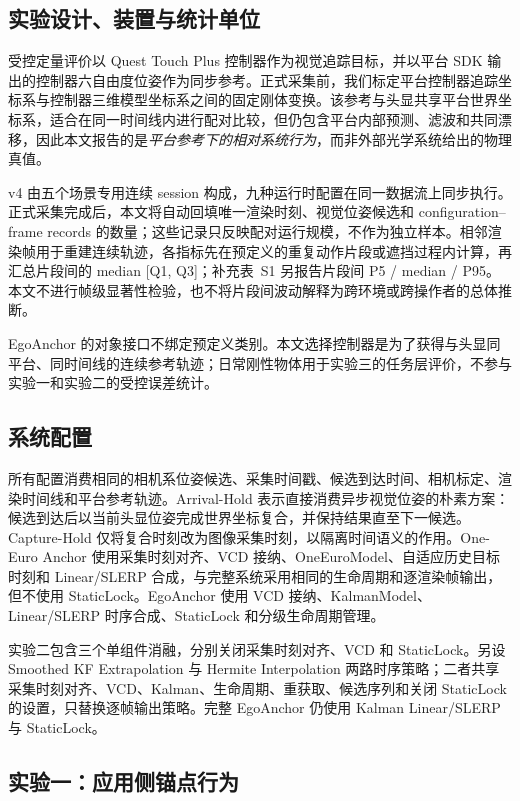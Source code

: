 \documentclass[review]{vgtc}
\begin{document}
\subsection{实验设计、装置与统计单位}

受控定量评价以 Quest Touch Plus 控制器作为视觉追踪目标，并以平台 SDK 输出的控制器六自由度位姿作为同步参考。正式采集前，我们标定平台控制器追踪坐标系与控制器三维模型坐标系之间的固定刚体变换。该参考与头显共享平台世界坐标系，适合在同一时间线内进行配对比较，但仍包含平台内部预测、滤波和共同漂移，因此本文报告的是\emph{平台参考下的相对系统行为}，而非外部光学系统给出的物理真值。

v4 由五个场景专用连续 session 构成，九种运行时配置在同一数据流上同步执行。正式采集完成后，本文将自动回填唯一渲染时刻、视觉位姿候选和 configuration--frame records 的数量；这些记录只反映配对运行规模，不作为独立样本。相邻渲染帧用于重建连续轨迹，各指标先在预定义的重复动作片段或遮挡过程内计算，再汇总片段间的 median [Q1, Q3]；补充表~S1 另报告片段间 P5 / median / P95。本文不进行帧级显著性检验，也不将片段间波动解释为跨环境或跨操作者的总体推断。

EgoAnchor 的对象接口不绑定预定义类别。本文选择控制器是为了获得与头显同平台、同时间线的连续参考轨迹；日常刚性物体用于实验三的任务层评价，不参与实验一和实验二的受控误差统计。

\subsection{系统配置}

所有配置消费相同的相机系位姿候选、采集时间戳、候选到达时间、相机标定、渲染时间线和平台参考轨迹。Arrival-Hold 表示直接消费异步视觉位姿的朴素方案：候选到达后以当前头显位姿完成世界坐标复合，并保持结果直至下一候选。Capture-Hold 仅将复合时刻改为图像采集时刻，以隔离时间语义的作用。One-Euro Anchor 使用采集时刻对齐、VCD 接纳、OneEuroModel、自适应历史目标时刻和 Linear/SLERP 合成，与完整系统采用相同的生命周期和逐渲染帧输出，但不使用 StaticLock。EgoAnchor 使用 VCD 接纳、KalmanModel、Linear/SLERP 时序合成、StaticLock 和分级生命周期管理。

实验二包含三个单组件消融，分别关闭采集时刻对齐、VCD 和 StaticLock。另设 Smoothed KF Extrapolation 与 Hermite Interpolation 两路时序策略；二者共享采集时刻对齐、VCD、Kalman、生命周期、重获取、候选序列和关闭 StaticLock 的设置，只替换逐帧输出策略。完整 EgoAnchor 仍使用 Kalman Linear/SLERP 与 StaticLock。


\subsection{实验一：应用侧锚点行为}
\end{document}
